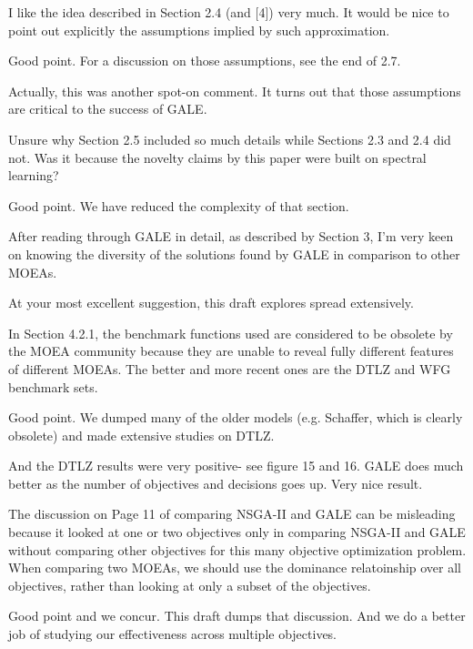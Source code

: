\documentclass[10pt,journal,compsoc]{IEEEtran}
\newenvironment{changed}{\par}{\par}
\begin{document}
I like the idea described in Section 2.4 (and [4]) very much.
It would be nice to point out explicitly the assumptions implied by such
approximation.


\begin{changed}
Good point. For a discussion on those assumptions,
see the end of {\textsection}2.7.

Actually, this was another spot-on comment. It turns out that those
assumptions are critical to the success of GALE.
\end{changed}

Unsure why Section 2.5 included so much details while Sections 2.3 and
2.4 did not. Was it because the novelty claims by this paper were built on
spectral learning?

\begin{changed}
Good point. We have reduced the complexity of that section.
\end{changed}


After reading through GALE in detail, as described by Section 3, I'm
very keen on knowing the diversity of the solutions found by GALE in
comparison to other MOEAs.


\begin{changed}
At your most excellent suggestion, this draft explores spread extensively.
\end{changed}

In Section 4.2.1, the benchmark functions used are considered to be
obsolete by the MOEA community because they are unable to reveal fully
different features of different MOEAs. The better and more recent ones are
the DTLZ and WFG benchmark sets.


\begin{changed}
Good point. We dumped many of the older models (e.g. Schaffer, which is clearly
obsolete) and made extensive studies on DTLZ. 

And the DTLZ results were very positive- see figure 15 and 16. GALE does much
better as the number of objectives and decisions goes up. Very nice result.
\end{changed}

The discussion on Page 11 of comparing NSGA-II and GALE can be misleading
because it looked at one or two objectives only in comparing NSGA-II and
GALE without comparing other objectives for this many objective
optimization problem. When comparing two MOEAs, we should use the dominance
relatoinship over all objectives, rather than looking at only a subset of
the objectives.
\begin{changed}
Good point and we concur. This draft dumps that discussion. And
we do a better job of studying our effectiveness across multiple objectives.
\end{changed}
\end{document}
